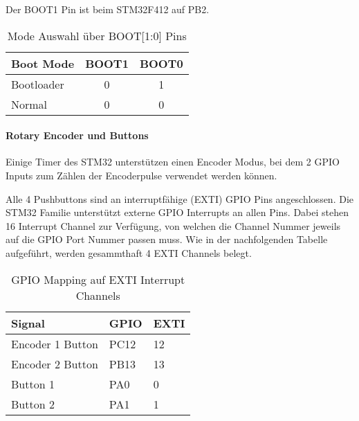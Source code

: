 Der BOOT1 Pin ist beim STM32F412 auf PB2.

\begin{table}[H]
\centering
\begin{tabular}{|l|c|c|}
\hline
\textbf{Boot Mode} & \textbf{BOOT1} & \textbf{BOOT0} \\ \hline
Bootloader         & 0              & 1              \\ \hline
Normal             & 0              & 0              \\ \hline
\end{tabular}
\caption{Mode Auswahl über BOOT[1:0] Pins}
\end{table}


\paragraph{Rotary Encoder und Buttons}

Einige Timer des STM32 unterstützen einen Encoder Modus, bei dem 2 GPIO Inputs zum Zählen der Encoderpulse verwendet werden können.

Alle 4 Pushbuttons sind an interruptfähige (EXTI) GPIO Pins angeschlossen. 
Die STM32 Familie unterstützt externe GPIO Interrupts an allen Pins. 
Dabei stehen 16 Interrupt Channel zur Verfügung, von welchen die Channel Nummer jeweils auf die GPIO Port Nummer passen muss. 
Wie in der nachfolgenden Tabelle aufgeführt, werden gesammthaft 4 EXTI Channels belegt.

\begin{table}[H]
\centering
\begin{tabular}{|l|l|l|}
\hline
\textbf{Signal}  & \textbf{GPIO} & \textbf{EXTI} \\ \hline
Encoder 1 Button & PC12          & 12            \\ \hline
Encoder 2 Button & PB13          & 13            \\ \hline
Button 1         & PA0           & 0             \\ \hline
Button 2         & PA1           & 1             \\ \hline
\end{tabular}
\caption{GPIO Mapping auf EXTI Interrupt Channels}
\end{table}





